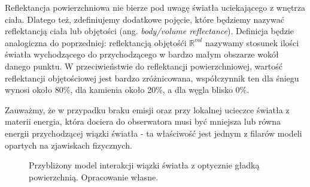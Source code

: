 \documentclass[../main.tex]{subfiles}
\begin{document}
Reflektancja powierzchniowa nie bierze pod uwagę światła uciekającego z wnętrza ciała. Dlatego też, zdefiniujemy dodatkowe pojęcie, które będziemy nazywać reflektancją ciała lub objętości (ang. \textit{body/volume reflectance}). Definicja będzie analogiczna do poprzedniej: reflektancją objętośći $\mathbb{R}^{\textit{vol}}$ nazywamy stosunek ilości światła wychodzącego do przychodzącego w bardzo małym obszarze wokół danego punktu. W przeciwieństwie do reflektancji powierzchniowej, wartość reflektancji objętościowej jest bardzo zróżnicowana, współczynnik ten dla śniegu wynosi około 80\%, dla kamienia około 20\%, a dla węgla blisko 0\%.

Zauważmy, że w przypadku braku emisji oraz przy lokalnej ucieczce światła z materii energia, która dociera do obserwatora musi być mniejsza lub równa energii przychodzącej wiązki światła - ta właściwość jest jednym z filarów modeli opartych na zjawiskach fizycznych.

\begin{figure}[ht]
  \centering
  \caption{Przybliżony model interakcji wiązki światła z optycznie gładką powierzchnią. Opracowanie własne.}
  \label{fig:ReflectionRefractionDetailed}
\end{figure}
\end{document}
